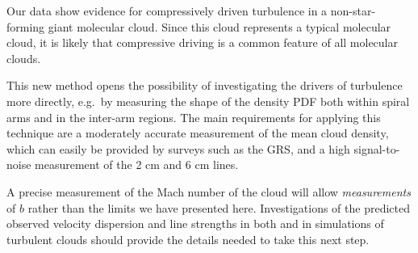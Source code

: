 Our data show evidence for compressively driven turbulence in a
non-star-forming giant molecular cloud.  Since this cloud represents a typical
molecular cloud, it is likely that compressive driving is a common feature of
all molecular clouds.

This new method opens the possibility of investigating the drivers of
turbulence more directly, e.g.\ by measuring the shape of the density PDF both
within spiral arms and in the inter-arm regions.  The main requirements for
applying this technique are a moderately accurate measurement of the mean cloud
density, which can easily be provided by \thirteenco surveys such as the GRS,
and a high signal-to-noise measurement of the 2 cm and 6 cm \formaldehyde
lines.  

A precise measurement of the Mach number of the cloud will allow
\emph{measurements} of $b$ rather than the limits we have presented here.
Investigations of the predicted observed velocity dispersion and line strengths
in both \formaldehyde and \thirteenco in simulations of turbulent clouds should
provide the details needed to take this next step.


% 
% 
% 
% 


